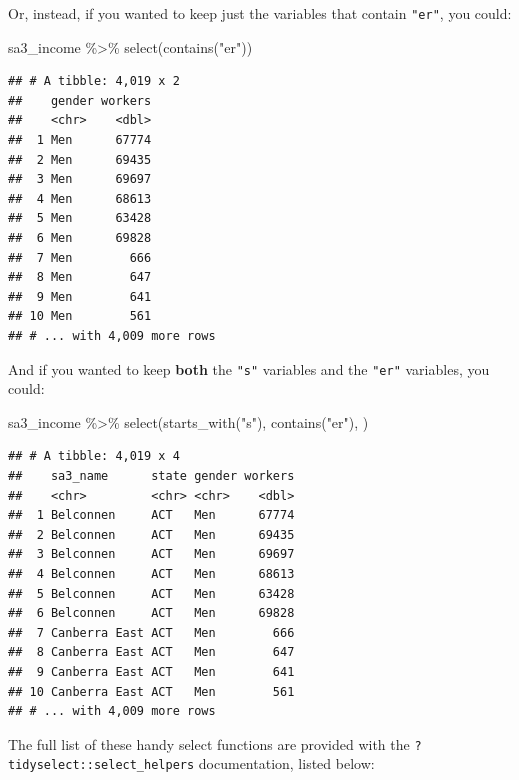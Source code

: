 \documentclass[
]{book}
\newenvironment{Shaded}{\begin{snugshade}}{\end{snugshade}}
\newcommand{\FunctionTok}[1]{\textcolor[rgb]{0.00,0.00,0.00}{#1}}
\newcommand{\NormalTok}[1]{#1}
\newcommand{\SpecialCharTok}[1]{\textcolor[rgb]{0.00,0.00,0.00}{#1}}
\newcommand{\StringTok}[1]{\textcolor[rgb]{0.31,0.60,0.02}{#1}}
\begin{document}
Or, instead, if you wanted to keep just the variables that contain \texttt{"er"}, you could:

\begin{Shaded}
\begin{Highlighting}[]
\NormalTok{sa3\_income }\SpecialCharTok{\%\textgreater{}\%} 
  \FunctionTok{select}\NormalTok{(}\FunctionTok{contains}\NormalTok{(}\StringTok{"er"}\NormalTok{))}
\end{Highlighting}
\end{Shaded}

\begin{verbatim}
## # A tibble: 4,019 x 2
##    gender workers
##    <chr>    <dbl>
##  1 Men      67774
##  2 Men      69435
##  3 Men      69697
##  4 Men      68613
##  5 Men      63428
##  6 Men      69828
##  7 Men        666
##  8 Men        647
##  9 Men        641
## 10 Men        561
## # ... with 4,009 more rows
\end{verbatim}

And if you wanted to keep \textbf{both} the \texttt{"s"} variables and the \texttt{"er"} variables, you could:

\begin{Shaded}
\begin{Highlighting}[]
\NormalTok{sa3\_income }\SpecialCharTok{\%\textgreater{}\%} 
  \FunctionTok{select}\NormalTok{(}\FunctionTok{starts\_with}\NormalTok{(}\StringTok{"s"}\NormalTok{), }\FunctionTok{contains}\NormalTok{(}\StringTok{"er"}\NormalTok{), )}
\end{Highlighting}
\end{Shaded}

\begin{verbatim}
## # A tibble: 4,019 x 4
##    sa3_name      state gender workers
##    <chr>         <chr> <chr>    <dbl>
##  1 Belconnen     ACT   Men      67774
##  2 Belconnen     ACT   Men      69435
##  3 Belconnen     ACT   Men      69697
##  4 Belconnen     ACT   Men      68613
##  5 Belconnen     ACT   Men      63428
##  6 Belconnen     ACT   Men      69828
##  7 Canberra East ACT   Men        666
##  8 Canberra East ACT   Men        647
##  9 Canberra East ACT   Men        641
## 10 Canberra East ACT   Men        561
## # ... with 4,009 more rows
\end{verbatim}

The full list of these handy select functions are provided with the \texttt{?tidyselect::select\_helpers} documentation, listed below:
\end{document}
